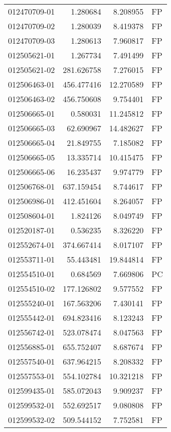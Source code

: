 \begin{tabular}{lrrl}
012470709-01 &    1.280684 &     8.208955 &   FP \\
012470709-02 &    1.280039 &     8.419378 &   FP \\
012470709-03 &    1.280613 &     7.960817 &   FP \\
012505621-01 &    1.267734 &     7.491499 &   FP \\
012505621-02 &  281.626758 &     7.276015 &   FP \\
012506463-01 &  456.477416 &    12.270589 &   FP \\
012506463-02 &  456.750608 &     9.754401 &   FP \\
012506665-01 &    0.580031 &    11.245812 &   FP \\
012506665-03 &   62.690967 &    14.482627 &   FP \\
012506665-04 &   21.849755 &     7.185082 &   FP \\
012506665-05 &   13.335714 &    10.415475 &   FP \\
012506665-06 &   16.235437 &     9.974779 &   FP \\
012506768-01 &  637.159454 &     8.744617 &   FP \\
012506986-01 &  412.451604 &     8.264057 &   FP \\
012508604-01 &    1.824126 &     8.049749 &   FP \\
012520187-01 &    0.536235 &     8.326220 &   FP \\
012552674-01 &  374.667414 &     8.017107 &   FP \\
012553711-01 &   55.443481 &    19.844814 &   FP \\
012554510-01 &    0.684569 &     7.669806 &   PC \\
012554510-02 &  177.126802 &     9.577552 &   FP \\
012555240-01 &  167.563206 &     7.430141 &   FP \\
012555442-01 &  694.823416 &     8.123243 &   FP \\
012556742-01 &  523.078474 &     8.047563 &   FP \\
012556885-01 &  655.752407 &     8.687674 &   FP \\
012557540-01 &  637.964215 &     8.208332 &   FP \\
012557553-01 &  554.102784 &    10.321218 &   FP \\
012599435-01 &  585.072043 &     9.909237 &   FP \\
012599532-01 &  552.692517 &     9.080808 &   FP \\
012599532-02 &  509.544152 &     7.752581 &   FP \\

\end{tabular}
